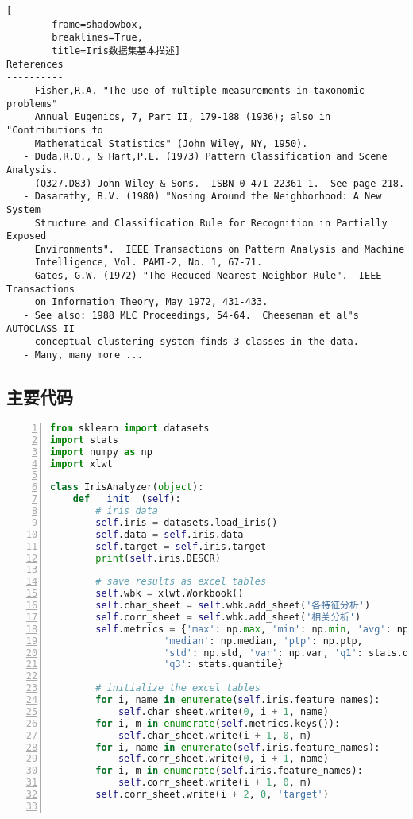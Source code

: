 \documentclass[12pt,a4paper]{article}
\theoremstyle{definition}
\begin{document}
\begin{appendix}
\begin{lstlisting}[
		frame=shadowbox,
		breaklines=True,
		title=Iris数据集基本描述]
References
----------
   - Fisher,R.A. "The use of multiple measurements in taxonomic problems"
     Annual Eugenics, 7, Part II, 179-188 (1936); also in "Contributions to
     Mathematical Statistics" (John Wiley, NY, 1950).
   - Duda,R.O., & Hart,P.E. (1973) Pattern Classification and Scene Analysis.
     (Q327.D83) John Wiley & Sons.  ISBN 0-471-22361-1.  See page 218.
   - Dasarathy, B.V. (1980) "Nosing Around the Neighborhood: A New System
     Structure and Classification Rule for Recognition in Partially Exposed
     Environments".  IEEE Transactions on Pattern Analysis and Machine
     Intelligence, Vol. PAMI-2, No. 1, 67-71.
   - Gates, G.W. (1972) "The Reduced Nearest Neighbor Rule".  IEEE Transactions
     on Information Theory, May 1972, 431-433.
   - See also: 1988 MLC Proceedings, 54-64.  Cheeseman et al"s AUTOCLASS II
     conceptual clustering system finds 3 classes in the data.
   - Many, many more ...
		\end{lstlisting}
		
	\subsection{主要代码}
		\begin{lstlisting}[language=Python,
		numbers=left,
		keywordstyle=\color{blue!70},
		commentstyle=\color{green!99!blue!99},
		frame=shadowbox,
		breaklines=True,
		title=Iris数据集探索代码]
from sklearn import datasets
import stats
import numpy as np
import xlwt

class IrisAnalyzer(object):
    def __init__(self):
        # iris data
        self.iris = datasets.load_iris()
        self.data = self.iris.data
        self.target = self.iris.target
        print(self.iris.DESCR)

        # save results as excel tables
        self.wbk = xlwt.Workbook()
        self.char_sheet = self.wbk.add_sheet('各特征分析')
        self.corr_sheet = self.wbk.add_sheet('相关分析')
        self.metrics = {'max': np.max, 'min': np.min, 'avg': np.mean,
                    'median': np.median, 'ptp': np.ptp,
                    'std': np.std, 'var': np.var, 'q1': stats.quantile,
                    'q3': stats.quantile}

        # initialize the excel tables
        for i, name in enumerate(self.iris.feature_names):
            self.char_sheet.write(0, i + 1, name)
        for i, m in enumerate(self.metrics.keys()):
            self.char_sheet.write(i + 1, 0, m)
        for i, name in enumerate(self.iris.feature_names):
            self.corr_sheet.write(0, i + 1, name)
        for i, m in enumerate(self.iris.feature_names):
            self.corr_sheet.write(i + 1, 0, m)
        self.corr_sheet.write(i + 2, 0, 'target')


\end{lstlisting}
\end{appendix}
\end{document}
